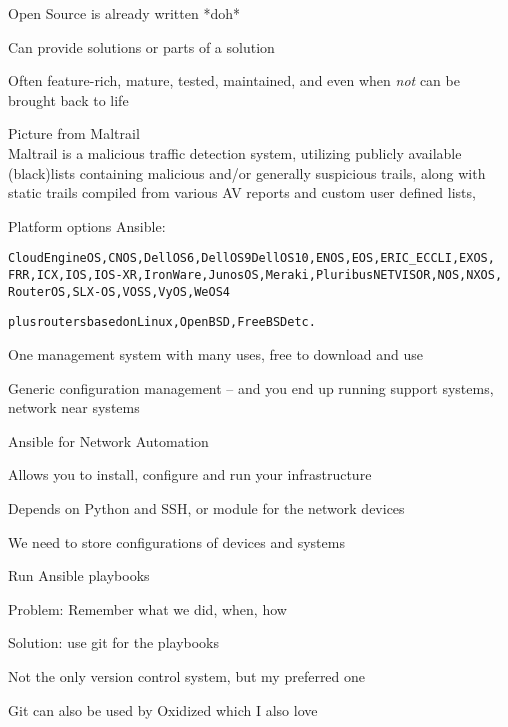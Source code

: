 \documentclass[Screen16to9,17pt]{foils}
\begin{document}

\begin{list2}
\item Open Source is already written *doh*
\item Can provide solutions or parts of a solution
\item Often feature-rich, mature, tested, maintained, and even when \emph{not} can be brought back to life
\item Picture from Maltrail \\
Maltrail is a malicious traffic detection system, utilizing publicly available (black)lists containing malicious and/or generally suspicious trails, along with static trails compiled from various AV reports and custom user defined lists,
\end{list2}






Platform options Ansible:
\begin{alltt}
CloudEngine OS, CNOS, Dell OS6, Dell OS9 Dell OS10, ENOS, EOS, ERIC_ECCLI, EXOS,
FRR, ICX, IOS, IOS-XR, IronWare, Junos OS, Meraki, Pluribus NETVISOR, NOS, NXOS,
RouterOS, SLX-OS, VOSS, VyOS, WeOS 4

plus routers based on Linux, OpenBSD, FreeBSD etc.
\end{alltt}

One management system with many uses, free to download and use
\begin{list2}
\item Generic configuration management -- and you end up running support systems, network near systems
\item Ansible for Network Automation\\
\item Allows you to install, configure and run your infrastructure
\item Depends on Python and SSH, or module for the network devices
\end{list2}



\begin{list2}
\item We need to store configurations of devices and systems
\item Run Ansible playbooks
\item Problem: Remember what we did, when, how
\item Solution: use git for the playbooks
\item Not the only version control system, but my preferred one
\item Git can also be used by Oxidized which I also love 
\end{list2}
\end{document}

